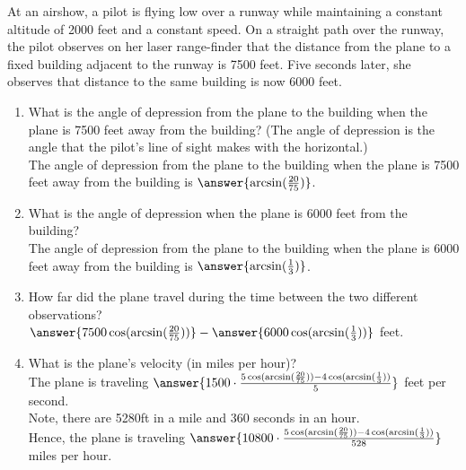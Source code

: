 \documentclass{ximera}
\author{Elizabeth Campolongo}
\begin{document}
\begin{exercise}
At an airshow, a pilot is flying low over a runway while maintaining a constant altitude of 2000 feet and a constant speed.  On a straight path over the runway, the pilot observes on her laser range-finder that the distance from the plane to a fixed building adjacent to the runway is 7500 feet.  Five seconds later, she observes that distance to the same building is now 6000 feet.%
\par
%
\begin{enumerate}
\item What is the angle of depression from the plane to the building when the plane is 7500 feet away from the building? (The angle of depression is the angle that the pilot's line of sight makes with the horizontal.) \\
%
The angle of depression from the plane to the building when the plane is 7500 feet away from the building is $\answer{\arcsin(\frac{20}{75})}$.
%
\item What is the angle of depression when the plane is 6000 feet from the building?\\
%
The angle of depression from the plane to the building when the plane is 6000 feet away from the building is $\answer{\arcsin(\frac{1}{3})}$.
%
\item How far did the plane travel during the time between the two different observations?\\
$\answer{7500\cos(\arcsin(\frac{20}{75}))} - \answer{6000\cos(\arcsin(\frac{1}{3}))}$ feet.
%
\item What is the plane's velocity (in miles per hour)? \\
The plane is traveling $\answer{1500\cdot\frac{5\cos(\arcsin(\frac{20}{75})) - 4\cos(\arcsin(\frac{1}{3}))}{5}}$ feet per second. \\
Note, there are 5280ft in a mile and 360 seconds in an hour. \\
Hence, the plane is traveling $\answer{10800\cdot\frac{5\cos(\arcsin(\frac{20}{75})) - 4\cos(\arcsin(\frac{1}{3}))}{528}}$ miles per hour.
%
\end{enumerate}
\end{exercise}
\end{document}
